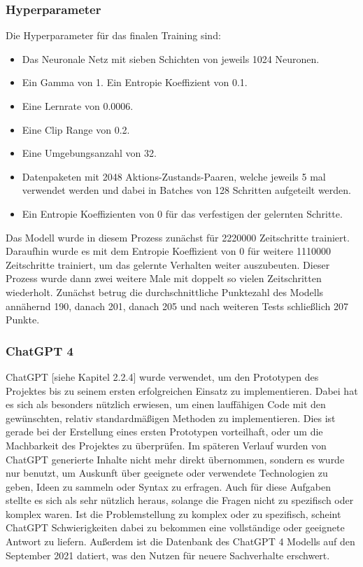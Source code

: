 \subsubsection{Hyperparameter}
Die Hyperparameter für das finalen Training sind:

\begin{itemize} 
\item Das Neuronale Netz mit sieben Schichten von jeweils 1024 Neuronen. 

\item Ein Gamma von 1. Ein Entropie Koeffizient von 0.1. 

\item Eine Lernrate von 0.0006. 

\item Eine Clip Range von 0.2. 

\item Eine Umgebungsanzahl von 32. 

\item Datenpaketen mit 2048 Aktions-Zustands-Paaren, welche jeweils 5 mal verwendet werden und dabei in Batches von 128 Schritten aufgeteilt werden. 

\item Ein Entropie Koeffizienten von 0 für das verfestigen der gelernten Schritte. 
\end{itemize} 

Das Modell wurde in diesem Prozess zunächst für 2220000 Zeitschritte trainiert. Daraufhin wurde es mit dem Entropie Koeffizient von 0 für weitere 1110000 Zeitschritte trainiert, um das gelernte Verhalten weiter auszubeuten. Dieser Prozess wurde dann zwei weitere Male mit doppelt so vielen Zeitschritten wiederholt. Zunächst betrug die durchschnittliche Punktezahl des Modells annähernd 190, danach 201, danach 205 und nach weiteren Tests schließlich 207 Punkte.


\subsubsection{ChatGPT 4}
ChatGPT [siehe Kapitel 2.2.4] wurde verwendet, um den Prototypen des Projektes bis zu seinem ersten erfolgreichen Einsatz zu implementieren. Dabei hat es sich als besonders nützlich erwiesen, um einen lauffähigen Code mit den gewünschten, relativ standardmäßigen Methoden zu implementieren. Dies ist gerade bei der Erstellung eines ersten Prototypen vorteilhaft, oder um die Machbarkeit des Projektes zu überprüfen. Im späteren Verlauf wurden von ChatGPT generierte Inhalte nicht mehr direkt übernommen, sondern es wurde nur benutzt, um Auskunft über geeignete oder verwendete Technologien zu geben, Ideen zu sammeln oder Syntax zu erfragen. Auch für diese Aufgaben stellte es sich als sehr nützlich heraus, solange die Fragen nicht zu spezifisch oder komplex waren. Ist die Problemstellung zu komplex oder zu spezifisch, scheint ChatGPT Schwierigkeiten dabei zu bekommen eine vollständige oder geeignete Antwort zu liefern. Außerdem ist die Datenbank des ChatGPT 4 Modells auf den September 2021 datiert, was den Nutzen für neuere Sachverhalte erschwert.